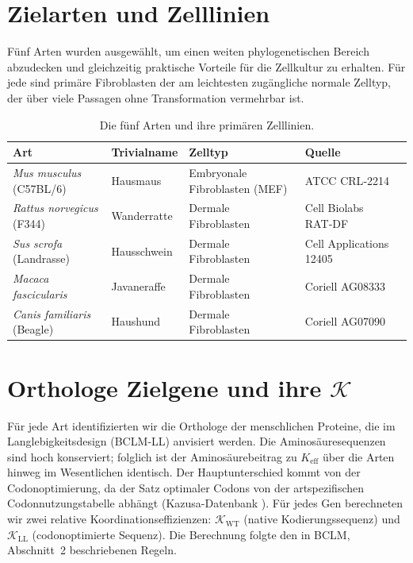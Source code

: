 \documentclass[12pt,a4paper]{article}
\newcommand{\REL}{\mathcal{K}}          %
\begin{document}
	\section{Zielarten und Zelllinien}
	\label{sec:species}
	Fünf Arten wurden ausgewählt, um einen weiten phylogenetischen Bereich abzudecken und gleichzeitig praktische Vorteile für die Zellkultur zu erhalten. Für jede sind primäre Fibroblasten der am leichtesten zugängliche normale Zelltyp, der über viele Passagen ohne Transformation vermehrbar ist.
	
	\begin{table}[H]
		\centering
		\caption{Die fünf Arten und ihre primären Zelllinien.}
		\label{tab:species}
		\begin{tabular}{@{}lllll@{}}
			\toprule
			\textbf{Art} & \textbf{Trivialname} & \textbf{Zelltyp} & \textbf{Quelle} \\
			\midrule
			\textit{Mus musculus} (C57BL/6) & Hausmaus & Embryonale Fibroblasten (MEF) & ATCC CRL‑2214 \\
			\textit{Rattus norvegicus} (F344) & Wanderratte & Dermale Fibroblasten & Cell Biolabs RAT‑DF \\
			\textit{Sus scrofa} (Landrasse) & Hausschwein & Dermale Fibroblasten & Cell Applications 12405 \\
			\textit{Macaca fascicularis} & Javaneraffe & Dermale Fibroblasten & Coriell AG08333 \\
			\textit{Canis familiaris} (Beagle) & Haushund & Dermale Fibroblasten & Coriell AG07090 \\
			\bottomrule
		\end{tabular}
	\end{table}
	
	\section{Orthologe Zielgene und ihre \(\REL\)}
	\label{sec:genes}
	Für jede Art identifizierten wir die Orthologe der menschlichen Proteine, die im Langlebigkeitsdesign (BCLM‑LL) anvisiert werden. Die Aminosäuresequenzen sind hoch konserviert; folglich ist der Aminosäurebeitrag zu \(K_{\mathrm{eff}}\) über die Arten hinweg im Wesentlichen identisch. Der Hauptunterschied kommt von der Codonoptimierung, da der Satz optimaler Codons von der artspezifischen Codonnutzungstabelle abhängt (Kazusa-Datenbank \cite{codon_usage_db}). Für jedes Gen berechneten wir zwei relative Koordinationseffizienzen: \(\REL_{\mathrm{WT}}\) (native Kodierungssequenz) und \(\REL_{\mathrm{LL}}\) (codonoptimierte Sequenz). Die Berechnung folgte den in BCLM, Abschnitt~2 beschriebenen Regeln.
	
\end{document}
